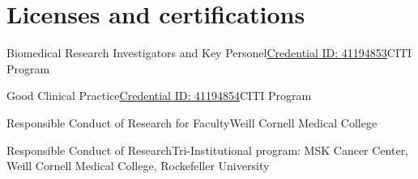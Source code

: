 \documentclass[11pt,a4paper,roman]{moderncv} %
\begin{document}


\section{Licenses and certifications}

        {Biomedical Research Investigators and Key Personel}{\href{https://www.citiprogram.org/verify/?w9102e99f-9a51-41fc-993b-e50ba7dafc36-41194853}{Credential ID: 41194853}}{}{}{CITI Program}

        {Good Clinical Practice}{\href{https://www.citiprogram.org/verify/?w50fab502-7953-4e4c-ac09-87d4aa204f2f-41194854}{Credential ID: 41194854}}{}{}{CITI Program}

        {Responsible Conduct of Research for Faculty}{}{}{}{Weill Cornell Medical College}

        {Responsible Conduct of Research}{}{}{}{Tri-Institutional program: MSK Cancer Center, Weill Cornell Medical College, Rockefeller University}

\end{document}

